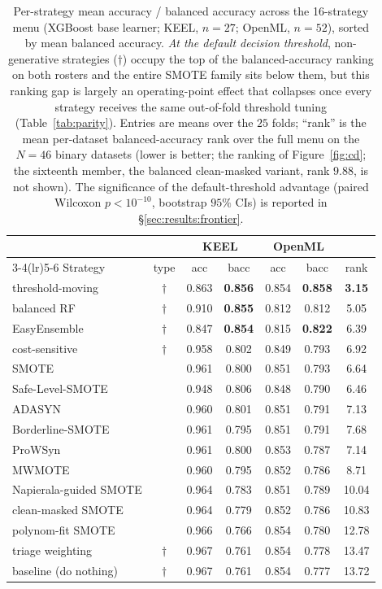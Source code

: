 \begin{table}[!tp]
\centering
\caption{Per-strategy mean accuracy / balanced accuracy across the 16-strategy
menu (XGBoost base learner; KEEL, $n{=}27$; OpenML, $n{=}52$), sorted by mean
balanced accuracy. \emph{At the default decision threshold}, non-generative
strategies ($\dagger$) occupy the top of the balanced-accuracy ranking on both
rosters and the entire SMOTE family sits below them, but this ranking gap is
largely an operating-point effect that collapses once every strategy receives the
same out-of-fold threshold tuning (Table~\ref{tab:parity}). Entries are means
over the $25$ folds; ``rank'' is the mean
per-dataset balanced-accuracy rank over the full menu on the $N{=}46$ binary
datasets (lower is better; the ranking of Figure~\ref{fig:cd}; the sixteenth
member, the balanced clean-masked variant, rank $9.88$, is not shown). The
significance of the default-threshold advantage (paired Wilcoxon $p<10^{-10}$,
bootstrap $95\%$ CIs) is reported in \S\ref{sec:results:frontier}.}
\label{tab:frontier}
\small
\begin{tabular}{l c cc cc c}
\toprule
 & & \multicolumn{2}{c}{KEEL} & \multicolumn{2}{c}{OpenML} & \\
\cmidrule(lr){3-4}\cmidrule(lr){5-6}
Strategy & type & acc & bacc & acc & bacc & rank \\
\midrule
threshold-moving        & $\dagger$ & 0.863 & \textbf{0.856} & 0.854 & \textbf{0.858} & \textbf{3.15} \\
balanced RF             & $\dagger$ & 0.910 & \textbf{0.855} & 0.812 & 0.812 & 5.05 \\
EasyEnsemble            & $\dagger$ & 0.847 & \textbf{0.854} & 0.815 & \textbf{0.822} & 6.39 \\
cost-sensitive          & $\dagger$ & 0.958 & 0.802 & 0.849 & 0.793 & 6.92 \\
SMOTE                   &           & 0.961 & 0.800 & 0.851 & 0.793 & 6.64 \\
Safe-Level-SMOTE        &           & 0.948 & 0.806 & 0.848 & 0.790 & 6.46 \\
ADASYN                  &           & 0.960 & 0.801 & 0.851 & 0.791 & 7.13 \\
Borderline-SMOTE        &           & 0.961 & 0.795 & 0.851 & 0.791 & 7.68 \\
ProWSyn                 &           & 0.961 & 0.800 & 0.853 & 0.787 & 7.14 \\
MWMOTE                  &           & 0.960 & 0.795 & 0.852 & 0.786 & 8.71 \\
Napierala-guided SMOTE  &           & 0.964 & 0.783 & 0.851 & 0.789 & 10.04 \\
clean-masked SMOTE      &           & 0.964 & 0.779 & 0.852 & 0.786 & 10.83 \\
polynom-fit SMOTE       &           & 0.966 & 0.766 & 0.854 & 0.780 & 12.78 \\
triage weighting        & $\dagger$ & 0.967 & 0.761 & 0.854 & 0.778 & 13.47 \\
baseline (do nothing)   & $\dagger$ & 0.967 & 0.761 & 0.854 & 0.777 & 13.72 \\
\bottomrule
\end{tabular}
\end{table}
